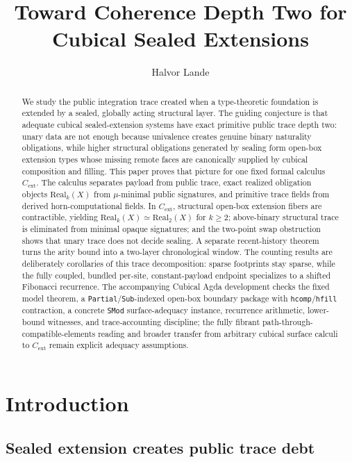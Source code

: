 \documentclass{lmcs}
\title[Toward Coherence Depth Two]{Toward Coherence Depth Two for Cubical Sealed Extensions}
\author[H.\ Lande]{Halvor Lande}
\newcommand{\Real}{\mathrm{Real}}
\newcommand{\Cext}{C_{\mathrm{ext}}}
\begin{document}
\begin{abstract}
We study the public integration trace created when a type-theoretic foundation is extended by a sealed, globally acting structural layer. The guiding conjecture is that adequate cubical sealed-extension systems have exact primitive public trace depth two: unary data are not enough because univalence creates genuine binary naturality obligations, while higher structural obligations generated by sealing form open-box extension types whose missing remote faces are canonically supplied by cubical composition and filling. This paper proves that picture for one fixed formal calculus $\Cext$. The calculus separates payload from public trace, exact realized obligation objects $\Real_k(X)$ from $\mu$-minimal public signatures, and primitive trace fields from derived horn-computational fields. In $\Cext$, structural open-box extension fibers are contractible, yielding $\Real_k(X)\simeq\Real_2(X)$ for $k\geq2$; above-binary structural trace is eliminated from minimal opaque signatures; and the two-point swap obstruction shows that unary trace does not decide sealing. A separate recent-history theorem turns the arity bound into a two-layer chronological window. The counting results are deliberately corollaries of this trace decomposition: sparse footprints stay sparse, while the fully coupled, bundled per-site, constant-payload endpoint specializes to a shifted Fibonacci recurrence. The accompanying Cubical Agda development checks the fixed model theorem, a \texttt{Partial}/\texttt{Sub}-indexed open-box boundary package with \texttt{hcomp}/\texttt{hfill} contraction, a concrete \texttt{SMod} surface-adequacy instance, recurrence arithmetic, lower-bound witnesses, and trace-accounting discipline; the fully fibrant path-through-compatible-elements reading and broader transfer from arbitrary cubical surface calculi to $\Cext$ remain explicit adequacy assumptions.
\end{abstract}

\maketitle

\section{Introduction}
\label{sec:introduction}

\subsection{Sealed extension creates public trace debt}
\end{document}
